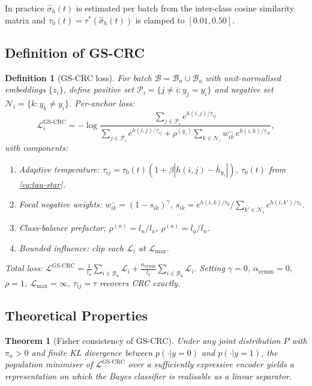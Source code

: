 \documentclass[conference]{IEEEtran}
\newtheorem{theorem}{Theorem}
\newtheorem{definition}{Definition}
\begin{document}
In practice $\hat\sigma_h(t)$ is estimated per batch from the inter-class
cosine similarity matrix and $\tau_0(t) = \tau^*(\hat\sigma_h(t))$ is
clamped to $[0.01, 0.50]$.

\subsection{Definition of GS-CRC}

\begin{definition}[GS-CRC loss]\label{def:gscrc}
For batch $\mathcal{B} = \mathcal{B}_n \cup \mathcal{B}_a$
with unit-normalised embeddings $\{z_i\}$, define positive set
$\mathcal{P}_i = \{j \neq i : y_j = y_i\}$ and negative set
$\mathcal{N}_i = \{k : y_k \neq y_i\}$.
Per-anchor loss:
\begin{equation}
\mathcal{L}_i^{\text{GS-CRC}}
= -\log\frac{
  \displaystyle\sum_{j\in\mathcal{P}_i} e^{h(i,j)/\tau_{ij}}
}{
  \displaystyle\sum_{j\in\mathcal{P}_i} e^{h(i,j)/\tau_{ij}}
  + \rho^{(y_i)}\!\sum_{k\in\mathcal{N}_i} w_{ik}^-\, e^{h(i,k)/\tau_{ik}}
},
\label{eq:gscrc}
\end{equation}
with components:
\begin{enumerate}
\item \emph{Adaptive temperature}:
      $\tau_{ij} = \tau_0(t)(1+\beta|h(i,j) - \bar{h}_{y_i}|)$,
      $\tau_0(t)$ from \eqref{eq:tau-star}.
\item \emph{Focal negative weights}:
      $w_{ik}^- = (1-s_{ik})^\gamma$,
      $s_{ik} = e^{h(i,k)/\tau_0}/\sum_{k'\in\mathcal{N}_i}
      e^{h(i,k')/\tau_0}$.
\item \emph{Class-balance prefactor}:
      $\rho^{(n)} = l_n/l_a$, $\rho^{(a)} = l_a/l_n$.
\item \emph{Bounded influence}: clip each $\mathcal{L}_i$ at $\mathcal{L}_{\max}$.
\end{enumerate}
Total loss:
$\mathcal{L}^{\text{GS-CRC}}
= \frac{1}{l_n}\sum_{i\in\mathcal{B}_n}\mathcal{L}_i
  + \frac{\alpha_{\text{symm}}}{l_a}\sum_{i\in\mathcal{B}_a}\mathcal{L}_i$.
Setting $\gamma=0$, $\alpha_{\text{symm}}=0$, $\rho=1$,
$\mathcal{L}_{\max}=\infty$, $\tau_{ij}=\tau$ recovers CRC exactly.
\end{definition}

\subsection{Theoretical Properties}

\begin{theorem}[Fisher consistency of GS-CRC]\label{thm:fisher-gscrc}
Under any joint distribution $P$ with $\pi_a > 0$ and finite
KL divergence between $p(\cdot|y=0)$ and $p(\cdot|y=1)$, the
population minimiser of $\mathcal{L}^{\text{GS-CRC}}$ over a sufficiently
expressive encoder yields a representation on which the Bayes classifier
is realisable as a linear separator.
\end{theorem}
\end{document}
